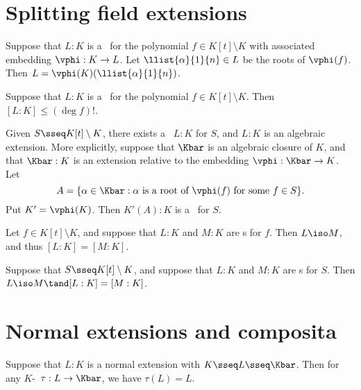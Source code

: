 \documentclass{article}
\begin{document}
\section{Splitting field extensions}
  \begin{tproposition}
    Suppose that \( L:K \) is a \sfe~for the polynomial \( f\in K[t]\setminus K \) with associated embedding \( \vphi:K\to L \). Let \( \llist{\alpha}{1}{n}\in L \) be the roots of \( \vphi(f) \). Then \( L=\vphi(K)(\llist{\alpha}{1}{n}) \).
  \end{tproposition}

  \begin{tproposition}
    Suppose that \( L:K \) is a \sfe~for the polynomial \( f\in K[t]\setminus K \). Then \( [L:K]\leq (\deg f)! \).
  \end{tproposition}

  \begin{tproposition}
    Given \( S\sseq K[t]\setminus K \), there exists a \sfe~\( L:K \) for \( S \), and \( L:K \) is an algebraic extension. More explicitly, suppose that \( \Kbar \) is an algebraic closure of \( K \), and that \( \Kbar:K \) is an extension relative to the embedding \( \vphi:\Kbar\to K \). Let
    \[
      A=\{ \alpha\in \Kbar : \alpha\text{ is a root of } \vphi(f) \text{ for some } f\in S \}.
    \]
    Put \( K'=\vphi(K) \). Then \( K'(A):K \) is a \sfe~for \( S \).
  \end{tproposition}

  \begin{ttheorem}
    Let \( f\in K[t]\setminus K \), and suppose that \( L:K \) and \( M:K \) are \sfe s for \( f \). Then \( L\iso M \), and thus \( [L:K]=[M:K] \).
  \end{ttheorem}

  \begin{ttheorem}
    Suppose that \( S\sseq K[t]\setminus K \), and suppose that \( L:K \) and \( M:K \) are \sfe s for \( S \). Then \( L\iso M\tand [L:K]=[M:K] \).
  \end{ttheorem}

\section{Normal extensions and composita}
  \begin{tproposition}
    Suppose that \( L:K \) is a normal extension with \( K\sseq L\sseq \Kbar \). Then for any \( K \)-\homo~\( \tau:L\to \Kbar \), we have \( \tau(L)=L \).
  \end{tproposition}
\end{document}
